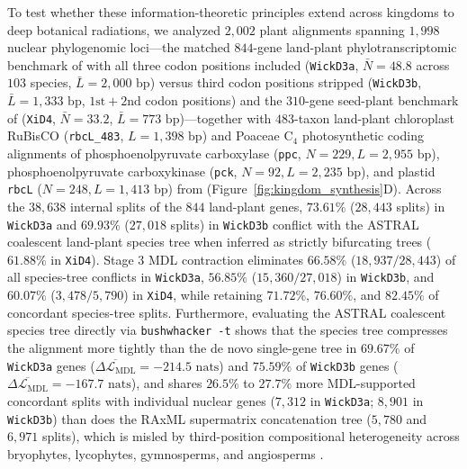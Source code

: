 \documentclass[11pt,a4paper]{article}
\begin{document}
To test whether these information-theoretic principles extend across kingdoms to deep botanical radiations, we analyzed $2,002$ plant alignments spanning $1,998$ nuclear phylogenomic loci---the matched $844$-gene land-plant phylotranscriptomic benchmark of \citet{wickett2014phylotranscriptomic} with all three codon positions included (\texttt{WickD3a}, $\bar{N} = 48.8$ across $103$ species, $\bar{L} = 2,000\text{ bp}$) versus third codon positions stripped (\texttt{WickD3b}, $\bar{L} = 1,333\text{ bp}$, $1\text{st}+2\text{nd}$ codon positions) and the $310$-gene seed-plant benchmark of \citet{xi2014coalescent} (\texttt{XiD4}, $\bar{N} = 33.2$, $\bar{L} = 773\text{ bp}$)---together with $483$-taxon land-plant chloroplast RuBisCO (\texttt{rbcL\_483}, $L = 1,398\text{ bp}$) and Poaceae $\text{C}_4$ photosynthetic coding alignments of phosphoenolpyruvate carboxylase (\texttt{ppc}, $N = 229, L = 2,955\text{ bp}$), phosphoenolpyruvate carboxykinase (\texttt{pck}, $N = 92, L = 2,235\text{ bp}$), and plastid \texttt{rbcL} ($N = 248, L = 1,413\text{ bp}$) from \citet{christin2007c4,christin2012adaptive} (Figure~\ref{fig:kingdom_synthesis}D). Across the $38,638$ internal splits of the $844$ land-plant genes, $73.61\%$ ($28,443$ splits) in \texttt{WickD3a} and $69.93\%$ ($27,018$ splits) in \texttt{WickD3b} conflict with the ASTRAL coalescent land-plant species tree when inferred as strictly bifurcating trees ($61.88\%$ in \texttt{XiD4}). Stage 3 MDL contraction eliminates $66.58\%$ ($18,937 / 28,443$) of all species-tree conflicts in \texttt{WickD3a}, $56.85\%$ ($15,360 / 27,018$) in \texttt{WickD3b}, and $60.07\%$ ($3,478 / 5,790$) in \texttt{XiD4}, while retaining $71.72\%$, $76.60\%$, and $82.45\%$ of concordant species-tree splits. Furthermore, evaluating the ASTRAL coalescent species tree directly via \texttt{bushwhacker -t} shows that the species tree compresses the alignment more tightly than the de novo single-gene tree in $69.67\%$ of \texttt{WickD3a} genes ($\overline{\Delta\mathcal{L}_{\text{MDL}}} = -214.5\text{ nats}$) and $75.59\%$ of \texttt{WickD3b} genes ($\overline{\Delta\mathcal{L}_{\text{MDL}}} = -167.7\text{ nats}$), and shares $26.5\%$ to $27.7\%$ more MDL-supported concordant splits with individual nuclear genes ($7,312$ in \texttt{WickD3a}; $8,901$ in \texttt{WickD3b}) than does the RAxML supermatrix concatenation tree ($5,780$ and $6,971$ splits), which is misled by third-position compositional heterogeneity across bryophytes, lycophytes, gymnosperms, and angiosperms \citep{wickett2014phylotranscriptomic,xi2014coalescent}.
\end{document}
